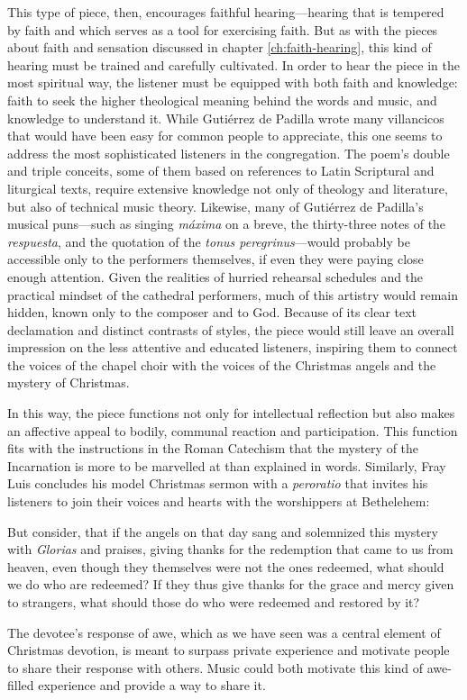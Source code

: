 This type of piece, then, encourages faithful hearing---hearing that is tempered
by faith and which serves as a tool for exercising faith.
But as with the pieces about faith and sensation discussed in chapter
\ref{ch:faith-hearing}, this kind of hearing must be trained and carefully
cultivated. 
In order to hear the piece in the most spiritual way, the listener must be
equipped with both faith and knowledge: faith to seek the higher theological
meaning behind the words and music, and knowledge to understand it.
While Gutiérrez de Padilla wrote many villancicos that would have been easy for common people
to appreciate, this one seems to address the most sophisticated listeners in the
congregation.
The poem's double and triple conceits, some of them based on references to Latin
Scriptural and liturgical texts, require extensive knowledge not only of
theology and literature, but also of technical music theory.
Likewise, many of Gutiérrez de Padilla's musical puns---such as singing \emph{máxima} on a
breve, the thirty-three notes of the \emph{respuesta}, and the quotation of the
\emph{tonus peregrinus}---would probably be accessible only to the performers
themselves, if even they were paying close enough attention.
Given the realities of hurried rehearsal schedules and the practical mindset of
the cathedral performers, much of this artistry would remain hidden, known only
to the composer and to God.
Because of its clear text declamation and distinct contrasts of styles, the
piece would still leave an overall impression on the less attentive and educated
listeners, inspiring them to connect the voices of the chapel choir with the
voices of the Christmas angels and the mystery of Christmas.

In this way, the piece functions not only for intellectual reflection but
also makes an affective appeal to bodily, communal reaction and participation.
This function fits with the instructions in the Roman Catechism that the mystery
of the Incarnation is more to be marvelled at than explained in words.
Similarly, Fray Luis concludes his model Christmas sermon with a
\emph{peroratio} that invites his listeners to join their voices and hearts with
the worshippers at Bethelehem:
\begin{quoting}
    But consider, that if the angels on that day sang and solemnized this
    mystery with \emph{Glorias} and praises, giving thanks 
    for the redemption that came to us from heaven, even though they themselves
    were not the ones redeemed, what should we do who are redeemed?
    If they thus give thanks for the grace  and mercy given
    to strangers, what should those do who were redeemed and restored by it?%
    \Autocite[41]{LuisdeGranada:Xmas}
\end{quoting}
The devotee's response of awe, which as we have seen was a central element of
Christmas devotion, is meant to surpass private experience and motivate people
to share their response with others.
Music could both motivate this kind of awe-filled experience and provide a way
to share it.

